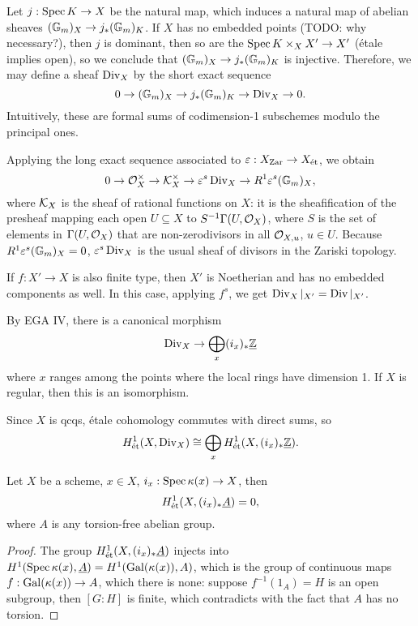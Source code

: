 \documentclass[11pt]{amsart}
\begin{document}
Let $j:\operatorname{Spec} K \to X$ be the natural map, which induces a natural map of abelian sheaves $(\mathbb{G}_m)_X\to j_\ast (\mathbb{G}_m)_{K}$. If $X$ has no embedded points (TODO: why necessary?), then $j$ is dominant, then so are the $\operatorname{Spec} K\times_X X'\to X'$ (\'etale implies open), so we conclude that $(\mathbb{G}_m)_X\to j_\ast (\mathbb{G}_m)_{K}$ is injective. Therefore, we may define a sheaf $\operatorname{Div}_X$ by the short exact sequence
\[0\to (\mathbb{G}_m)_X\to j_\ast (\mathbb{G}_m)_K\to \operatorname{Div}_X\to 0.\]
Intuitively, these are formal sums of codimension-1 subschemes modulo the principal ones.

Applying the long exact sequence associated to $\varepsilon: X_{\operatorname{Zar}}\to X_{\operatorname{\acute{e}t}}$, we obtain
\[0\to \mathcal{O}_X^{\times} \to \mathcal{K}_X^{\times} \to \varepsilon^s\operatorname{Div}_X\to R^1\varepsilon^s(\mathbb{G}_m)_X,\]
where $\mathcal{K}_X$ is the sheaf of rational functions on $X$: it is the sheafification of the presheaf mapping each open $U\subseteq X$ to $S^{-1}\Gamma(U, \mathcal{O}_X)$, where $S$ is the set of elements in $\Gamma(U, \mathcal{O}_X)$ that are non-zerodivisors in all $\mathcal{O}_{X,u}$, $u\in U$. Because $R^1\varepsilon^s(\mathbb{G}_m)_X = 0$, $\varepsilon^s\operatorname{Div}_X$ is the usual sheaf of divisors in the Zariski topology.

If $f:X'\to X$ is also finite type, then $X'$ is Noetherian and has no embedded components as well. In this case, applying $f^s$, we get $\operatorname{Div}_X|_{X'} = \operatorname{Div}|_{X'}$.

By EGA IV, there is a canonical morphism
\[\operatorname{Div}_X\to \bigoplus_{x} (i_x)_\ast \underline{\mathbb{Z}}\]
where $x$ ranges among the points where the local rings have dimension 1. If $X$ is regular, then this is an isomorphism.

Since $X$ is qcqs, \'etale cohomology commutes with direct sums, so
\[H^1_{\operatorname{\acute{e}t}}(X, \operatorname{Div}_X) \cong \bigoplus_x H^1_{\operatorname{\acute{e}t}}(X, (i_x)_\ast \underline{\mathbb{Z}}).\]

\begin{lem}
    Let $X$ be a scheme, $x\in X$, $i_x: \operatorname{Spec} \kappa(x) \to X$, then
    \[H^1_{\operatorname{\acute{e}t}}(X, (i_x)_\ast \underline{A}) = 0,\]
    where $A$ is any torsion-free abelian group.
\end{lem}

\begin{proof}
    The group $H^1_{\operatorname{\acute{e}t}}(X, (i_x)_{\ast}\underline{A})$ injects into $H^1(\operatorname{Spec} \kappa(x), \underline{A}) = H^1(\operatorname{Gal}(\kappa(x)), A)$, which is the group of continuous maps $f:\operatorname{Gal}(\kappa(x))\to A$, which there is none: suppose $f^{-1}(1_A) = H$ is an open subgroup, then $[G:H]$ is finite, which contradicts with the fact that $A$ has no torsion.
\end{proof}
\end{document}
